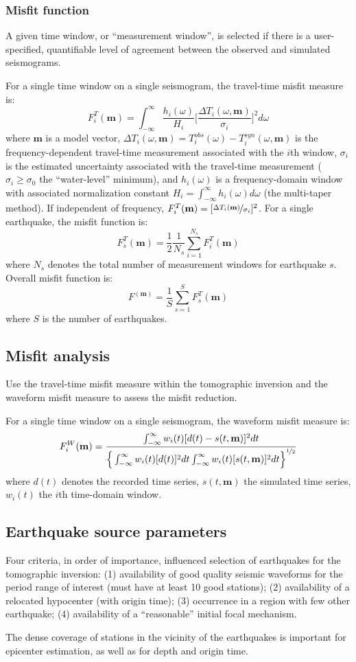\documentclass{article}
\newcommand{\mbf}[1]{\mathbf{#1}}
\begin{document}
\subsubsection{Misfit function}
A given time window, or ``measurement window'', is selected if there is a user-specified, quantifiable level of agreement between the observed and simulated seismograms.\par
For a single time window on a single seismogram, the travel-time misfit measure is:
\[ F_i^T(\mbf m)=\int_{-\infty}^\infty \frac{h_i(\omega)}{H_i}\Big[\frac{\Delta T_i(\omega,\mbf m)}{\sigma_i}\Big]^2d\omega \]
where $\mbf m$ is a model vector, $\Delta T_i(\omega,\mbf m)=T_i^{obs}(\omega)-T_i^{syn}(\omega,\mbf m)$ is the frequency-dependent travel-time measurement associated with the $i$th window, $\sigma_i$ is the estimated uncertainty associated with the travel-time measurement ($\sigma_i\geqslant\sigma_0$ the ``water-level'' minimum), and $h_i(\omega)$ is a frequency-domain window with associated normalization constant $H_i=\int_{-\infty}^\infty h_i(\omega)d\omega$ (the multi-taper method). If independent of frequency, $F_i^T(\mbf m)=[\nicefrac{\Delta T_i(\mbf m)}{\sigma_i}]^2$. For a single earthquake, the misfit function is:
\[ F_s^T(\mbf m)=\frac{1}{2}\frac{1}{N_s}\sum_{i=1}^{N_s}F_i^T(\mbf m) \]
where $N_s$ denotes the total number of measurement windows for earthquake $s$. Overall misfit function is:
\[ F^(\mbf m)=\frac{1}{S}\sum_{s=1}^SF_s^T(\mbf m) \]
where $S$ is the number of earthquakes.\par
\subsection{Misfit analysis}
Use the travel-time misfit measure within the tomographic inversion and the waveform misfit measure to assess the misfit reduction.\par
For a single time window on a single seismogram, the waveform misfit measure is:
\[ F_i^W(\mbf m)=\frac{\int_{-\infty}^\infty w_i(t)[d(t)-s(t,\mbf m)]^2dt}{\Big\{\int_{-\infty}^\infty w_i(t)[d(t)]^2dt\int_{-\infty}^\infty w_i(t)[s(t,\mbf m)]^2dt\Big\}^{\nicefrac{1}{2}}} \]
where $d(t)$ denotes the recorded time series, $s(t,\mbf m)$ the simulated time series, $w_i(t)$ the $i$th time-domain window.\par
\subsection{Earthquake source parameters}
Four criteria, in order of importance, influenced selection of earthquakes for the tomographic inversion: (1) availability of good quality seismic waveforms for the period range of interest (must have at least 10 good stations); (2) availability of a relocated hypocenter (with origin time); (3) occurrence in a region with few other earthquake; (4) availability of a ``reasonable'' initial focal mechanism.\par
The dense coverage of stations in the vicinity of the earthquakes is important for epicenter estimation, as well as for depth and origin time.\par
\vspace{5mm}
\end{document}
